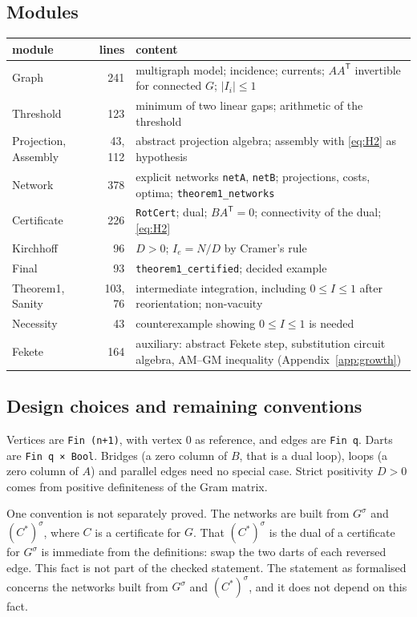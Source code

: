 \documentclass[11pt]{amsart}
\theoremstyle{plain}
\theoremstyle{definition}
\theoremstyle{remark}
\newcommand{\T}{\mathsf{T}}
\newcommand{\code}[1]{\texttt{#1}}
\begin{document}
\subsection{Modules}
\begin{center}
\small
\begin{tabularx}{\linewidth}{>{\ttfamily}l r X}
\toprule
\textrm{module} & lines & content\\
\midrule
Graph & 241 & multigraph model; incidence; currents; $AA^{\T}$ invertible for connected $G$; $|I_i|\le 1$\\
Threshold & 123 & minimum of two linear gaps; arithmetic of the threshold\\
Projection, Assembly & 43, 112 & abstract projection algebra; assembly with \eqref{eq:H2} as hypothesis\\
Network & 378 & explicit networks \code{netA}, \code{netB}; projections, costs, optima; \code{theorem1\_networks}\\
Certificate & 226 & \code{RotCert}; dual; $BA^{\T}=0$; connectivity of the dual; \eqref{eq:H2}\\
Kirchhoff & 96 & $D>0$; $I_e=N/D$ by Cramer's rule\\
Final & 93 & \code{theorem1\_certified}; decided example\\
Theorem1, Sanity & 103, 76 & intermediate integration, including $0\le I\le1$ after reorientation; non-vacuity\\
Necessity & 43 & counterexample showing $0\le I\le1$ is needed\\
Fekete & 164 & auxiliary: abstract Fekete step, substitution circuit algebra, AM--GM inequality (Appendix~\ref{app:growth})\\
\bottomrule
\end{tabularx}
\end{center}

\subsection{Design choices and remaining conventions}
Vertices are \code{Fin (n+1)}, with vertex $0$ as reference, and edges are \code{Fin q}. Darts are
\code{Fin q × Bool}. Bridges (a zero column of $B$, that is a dual loop), loops (a zero column of $A$) and parallel
edges need no special case. Strict positivity $D>0$ comes from positive definiteness of the Gram matrix.

One convention is not separately proved. The networks are built from $G^\sigma$ and $(C^\ast)^\sigma$, where $C$ is
a certificate for $G$. That $(C^\ast)^\sigma$ is the dual of a certificate for $G^\sigma$ is immediate from the
definitions: swap the two darts of each reversed edge. This fact is not part of the checked statement. The
statement as formalised concerns the networks built from $G^\sigma$ and $(C^\ast)^\sigma$, and it does not depend
on this fact.
\end{document}
